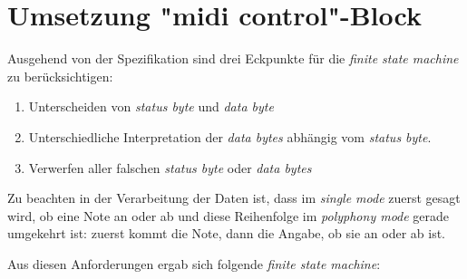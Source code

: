 \section{Umsetzung "midi control"-Block}\label{sect.midi_umsetzung}
Ausgehend von der Spezifikation sind drei Eckpunkte für die \textit{finite state machine} zu berücksichtigen:\\
\begin{enumerate}
	\item Unterscheiden von \textit{status byte} und \textit{data byte}
	\item Unterschiedliche Interpretation der \textit{data bytes} abhängig vom \textit{status byte}.
	\item Verwerfen aller falschen \textit{status byte} oder \textit{data bytes}
\end{enumerate}

Zu beachten in der Verarbeitung der Daten ist, dass im \textit{single mode} zuerst gesagt wird, ob eine Note an oder ab und diese Reihenfolge im \textit{polyphony mode} gerade umgekehrt ist: zuerst kommt die Note, dann die Angabe, ob sie an oder ab ist.

Aus diesen Anforderungen ergab sich folgende \textit{finite state machine}:

